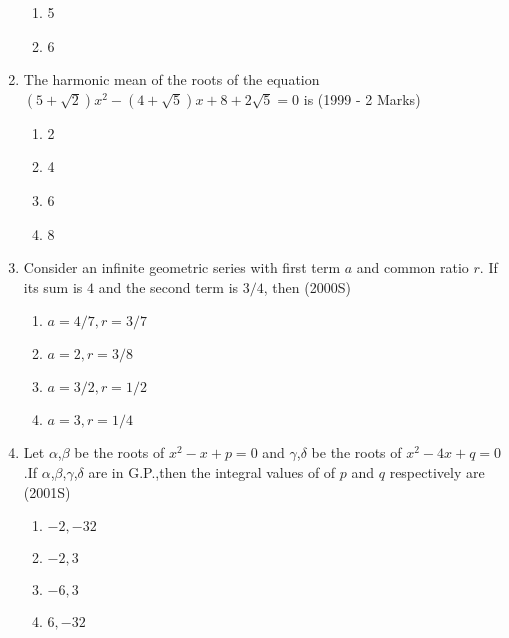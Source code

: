 \documentclass[journal,12pt,twocolumn]{IEEEtran}
\theoremstyle{remark}
\begin{document}
\begin{enumerate}
\begin{enumerate}
        \item 5
        \item 6
        \end{enumerate}
\item The harmonic mean of the roots of the equation
        $(5+\sqrt{2})x^2-(4+\sqrt{5})x+8+2\sqrt{5}=0$ is 
        \hfill(1999 - 2 Marks)
        \begin{enumerate}
            \item 2
            \item 4
            \item 6
            \item 8
        \end{enumerate}
\item Consider an infinite geometric series with first term $a$ and common ratio $r$. If its sum is $4$ and the second term is $3/4$, then \hfill (2000S)
        \begin{enumerate}
            \item $a=4/7,r=3/7$
            \item $a=2,r=3/8$
            \item $a=3/2,r=1/2$
            \item $a=3,r=1/4$
            \end{enumerate}
\item Let $\alpha$,$\beta$ be the roots of $x^2-x+p=0$ and $\gamma$,$\delta$ be the roots of $x^2-4x+q=0$.If $\alpha$,$\beta$,$\gamma$,$\delta$ are in G.P.,then the integral values of of $p$ and $q$ respectively are \hfill(2001S)
            \begin{enumerate}
                \item $-2,-32$
                \item $-2,3$
                \item $-6,3$
                \item $6,-32$
        

\end{enumerate}
\end{enumerate}
\end{document}
